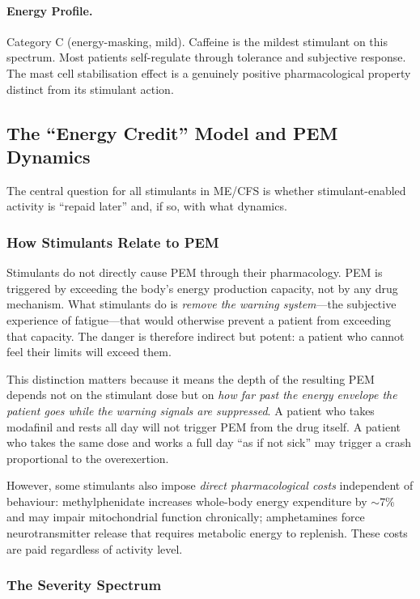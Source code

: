 \paragraph{Energy Profile.}
Category C (energy-masking, mild). Caffeine is the mildest stimulant on this spectrum. Most patients self-regulate through tolerance and subjective response. The mast cell stabilisation effect is a genuinely positive pharmacological property distinct from its stimulant action.

\subsection{The ``Energy Credit'' Model and PEM Dynamics}
\label{subsec:energy-credit}

The central question for all stimulants in ME/CFS is whether stimulant-enabled activity is ``repaid later'' and, if so, with what dynamics.

\subsubsection{How Stimulants Relate to PEM}

Stimulants do not directly cause PEM through their pharmacology. PEM is triggered by exceeding the body's energy production capacity, not by any drug mechanism. What stimulants do is \textit{remove the warning system}---the subjective experience of fatigue---that would otherwise prevent a patient from exceeding that capacity. The danger is therefore indirect but potent: a patient who cannot feel their limits will exceed them.

This distinction matters because it means the depth of the resulting PEM depends not on the stimulant dose but on \textit{how far past the energy envelope the patient goes while the warning signals are suppressed}. A patient who takes modafinil and rests all day will not trigger PEM from the drug itself. A patient who takes the same dose and works a full day ``as if not sick'' may trigger a crash proportional to the overexertion.

However, some stimulants also impose \textit{direct pharmacological costs} independent of behaviour: methylphenidate increases whole-body energy expenditure by ${\sim}$7\% and may impair mitochondrial function chronically; amphetamines force neurotransmitter release that requires metabolic energy to replenish. These costs are paid regardless of activity level.

\subsubsection{The Severity Spectrum}

